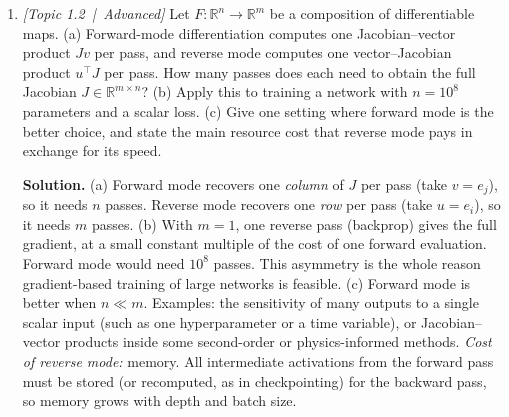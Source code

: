 \documentclass[11pt]{article}
\newcommand{\relu}{\operatorname{ReLU}}
\newcommand{\R}{\mathbb{R}}
\begin{document}
\begin{enumerate}[label=\textbf{Q\arabic*}, leftmargin=*]
  \textbf{Solution.} (a) $g = 0$ for $x\le0$; $g = x$ on $[0,1]$; $g = x - 2(x-1) = 2 - x$ on $[1,2]$; $g = 2 - x + (x-2) = 0$ for $x\ge 2$. This is a hat of height 1 at $x=1$, supported on $[0,2]$.
  (b) Take $\beta$ to be the slope of $h$ left of $t_1$ and $\alpha$ the matching intercept, so the formula agrees with $h$ for $x < t_1$. Each $\relu(x - t_j)$ is zero left of $t_j$ and has slope 1 to the right, so adding $c_j\relu(x-t_j)$ changes the slope by exactly $c_j$ at $t_j$ and nowhere else. Set $c_j$ equal to the slope of $h$ just right of $t_j$ minus the slope just left of it. The two continuous functions then agree on the first piece and have equal slopes on every piece, so they are equal everywhere.
  (c) Any continuous function on $[a,b]$ is uniformly continuous, so its piecewise-linear interpolant on a fine enough grid is uniformly within $\varepsilon$ of it. By (b), that interpolant is a one-hidden-layer ReLU network. \emph{Not answered:} how fine the grid must be. For an $L$-Lipschitz target, a spacing of order $\varepsilon/L$ suffices, so about $L/\varepsilon$ units are needed in 1-D. In $d$ dimensions, grid-based constructions need on the order of $(L/\varepsilon)^d$ units. The existence argument gives no efficient rate in general.

  \item \textit{[Topic 1.2 \,|\, Advanced]} Let $F:\R^n\to\R^m$ be a composition of differentiable maps. (a) Forward-mode differentiation computes one Jacobian--vector product $J v$ per pass, and reverse mode computes one vector--Jacobian product $u^\top J$ per pass. How many passes does each need to obtain the full Jacobian $J\in\R^{m\times n}$? (b) Apply this to training a network with $n = 10^8$ parameters and a scalar loss. (c) Give one setting where forward mode is the better choice, and state the main resource cost that reverse mode pays in exchange for its speed.

  \textbf{Solution.} (a) Forward mode recovers one \emph{column} of $J$ per pass (take $v = e_j$), so it needs $n$ passes. Reverse mode recovers one \emph{row} per pass (take $u = e_i$), so it needs $m$ passes.
  (b) With $m = 1$, one reverse pass (backprop) gives the full gradient, at a small constant multiple of the cost of one forward evaluation. Forward mode would need $10^8$ passes. This asymmetry is the whole reason gradient-based training of large networks is feasible.
  (c) Forward mode is better when $n \ll m$. Examples: the sensitivity of many outputs to a single scalar input (such as one hyperparameter or a time variable), or Jacobian--vector products inside some second-order or physics-informed methods. \emph{Cost of reverse mode:} memory. All intermediate activations from the forward pass must be stored (or recomputed, as in checkpointing) for the backward pass, so memory grows with depth and batch size.


\end{enumerate}
\end{document}
